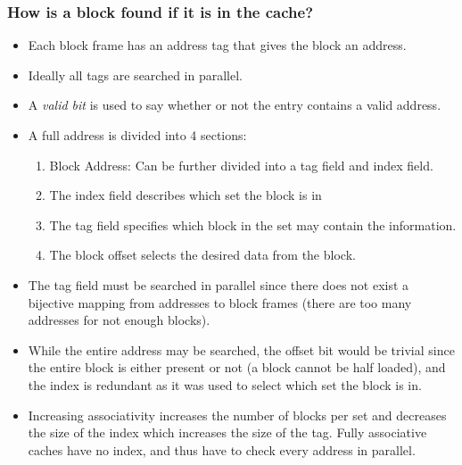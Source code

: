 \documentclass[11pt, a4paper]{article}
\theoremstyle{definition}
\theoremstyle{remark}
\begin{document}
\subsubsection{How is a block found if it is in the cache?}
\begin{itemize}
  \item Each block frame has an address tag that gives the block an address. 
  \item Ideally all tags are searched in parallel.
  \item A \textit{valid bit} is used to say whether or not the entry contains a valid address. 
  \item A full address is divided into 4 sections:
  \begin{enumerate}
    \item Block Address: Can be further divided into a tag field and index field.
    \item The index field describes which set the block is in 
    \item The tag field specifies which block in the set may contain the information.
    \item The block offset selects the desired data from the block.
  \end{enumerate}
  \item The tag field must be searched in parallel since there does not exist a bijective mapping from addresses to block frames (there are too many addresses for not enough blocks).
  \item While the entire address may be searched, the offset bit would be trivial since the entire block is either present or not (a block cannot be half loaded), and the index is redundant as it was used to select which set the block is in.
  \item Increasing associativity increases the number of blocks per set and decreases the size of the index which increases the size of the tag. Fully associative caches have no index, and thus have to check every address in parallel.
\end{itemize}
\end{document}
